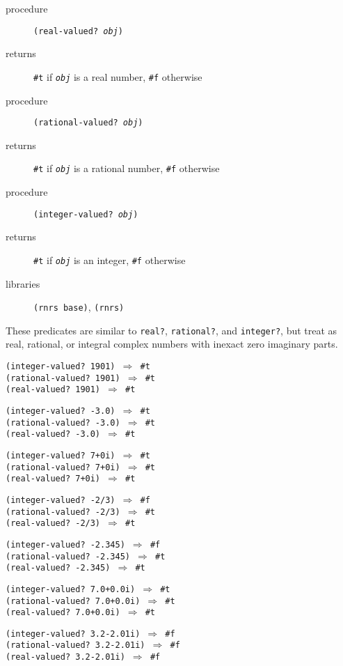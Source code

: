 \begin{description}

\label{objects_s18}\item[procedure] \texttt{(real-valued? \textit{obj})}



\item[returns] \texttt{\#{}t} if \texttt{\textit{obj}} is a real number, \texttt{\#{}f} otherwise


\item[procedure] \texttt{(rational-valued? \textit{obj})}



\item[returns] \texttt{\#{}t} if \texttt{\textit{obj}} is a rational number, \texttt{\#{}f} otherwise


\item[procedure] \texttt{(integer-valued? \textit{obj})}



\item[returns] \texttt{\#{}t} if \texttt{\textit{obj}} is an integer, \texttt{\#{}f} otherwise


\item[libraries] \texttt{(rnrs base)}, \texttt{(rnrs)}
\end{description}


These predicates are similar to \texttt{real?}, \texttt{rational?}, and
\texttt{integer?}, but treat as real, rational, or integral complex numbers
with inexact zero imaginary parts.


\begin{alltt}
(integer-valued? 1901) \(\Rightarrow\) \#{}t
(rational-valued? 1901) \(\Rightarrow\) \#{}t
(real-valued? 1901) \(\Rightarrow\) \#{}t

(integer-valued? -3.0) \(\Rightarrow\) \#{}t
(rational-valued? -3.0) \(\Rightarrow\) \#{}t
(real-valued? -3.0) \(\Rightarrow\) \#{}t

(integer-valued? 7+0i) \(\Rightarrow\) \#{}t
(rational-valued? 7+0i) \(\Rightarrow\) \#{}t
(real-valued? 7+0i) \(\Rightarrow\) \#{}t

(integer-valued? -2/3) \(\Rightarrow\) \#{}f
(rational-valued? -2/3) \(\Rightarrow\) \#{}t
(real-valued? -2/3) \(\Rightarrow\) \#{}t

(integer-valued? -2.345) \(\Rightarrow\) \#{}f
(rational-valued? -2.345) \(\Rightarrow\) \#{}t
(real-valued? -2.345) \(\Rightarrow\) \#{}t

(integer-valued? 7.0+0.0i) \(\Rightarrow\) \#{}t
(rational-valued? 7.0+0.0i) \(\Rightarrow\) \#{}t
(real-valued? 7.0+0.0i) \(\Rightarrow\) \#{}t

(integer-valued? 3.2-2.01i) \(\Rightarrow\) \#{}f
(rational-valued? 3.2-2.01i) \(\Rightarrow\) \#{}f
(real-valued? 3.2-2.01i) \(\Rightarrow\) \#{}f
\end{alltt}


